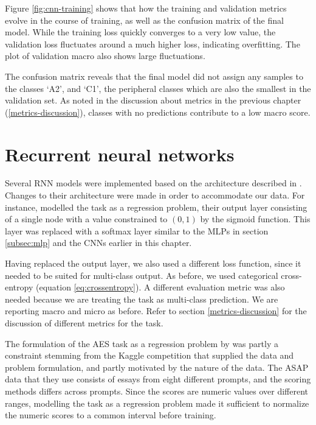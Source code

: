 Figure \ref{fig:cnn-training} shows that how the training and validation
metrics evolve in the course of training, as well as the confusion matrix of
the final model. While the training loss quickly converges to a very low
value, the validation loss fluctuates around a much higher loss, indicating
overfitting. The plot of validation macro \FI also shows large fluctuations.

The confusion matrix reveals that the final model did not assign any samples
to the classes `A2', and `C1', the peripheral classes which are also the
smallest in the validation set. As noted in the discussion about metrics in
the previous chapter (\ref{metrics-discussion}), classes with no predictions
contribute to a low macro \FI score.


\section{Recurrent neural networks}

Several \ac{RNN} models were implemented based on the architecture described in
\textcite{taghipour16}. Changes to their architecture were made in
order to accommodate our data. For instance, \citeauthor{taghipour16} modelled
the task as a regression problem, their output layer consisting of a single
node with a value constrained to $(0,1)$ by the sigmoid function. This layer
was replaced with a softmax layer similar to the \acp{MLP} in section
\ref{subsec:mlp} and the \acp{CNN} earlier in this chapter.

Having replaced the output layer, we also used a different loss function,
since it needed to be suited for multi-class output. As before, we used
categorical cross-entropy (equation \ref{eq:crossentropy}). A different
evaluation metric was also needed because we are treating the task as
multi-class prediction. We are reporting macro and micro \FI as before. Refer
to section \ref{metrics-discussion} for the discussion of different metrics
for the task.

The formulation of the \ac{AES} task as a regression problem by
\citeauthor{taghipour16} was partly a constraint stemming from the Kaggle
competition that supplied the data and problem formulation, and partly
motivated by the nature of the data. The ASAP data that they use consists of
essays from eight different prompts, and the scoring methods differs across
prompts. Since the scores are numeric values over different ranges, modelling
the task as a regression problem made it sufficient to normalize the numeric
scores to a common interval before training.

